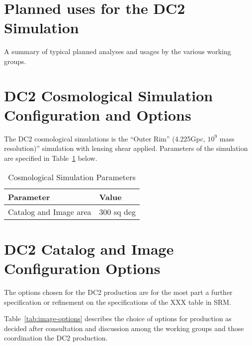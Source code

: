 \documentclass[12pt,letterpaper]{article}
\begin{document}
\section{Planned uses for the DC2 Simulation}

A summary of typical planned analyses and usages by the various
working groups.


\section{DC2 Cosmological Simulation Configuration and Options}

The DC2 cosmological simulations is the “Outer Rim” (4.225Gpc, $10^9$
mass resolution)” simulation with lensing shear applied.  Parameters
of the simulation are specified in Table~\ref{tab:csim-options} below.

\begin{table}[!htb]
  \centering
  \begin{tabular}{| l| l| }
    \hline 
    Parameter                       & Value   \\
    \hline
    Catalog and Image area  & 300 sq deg \\
     \hline
  \end{tabular}
  \caption{Cosmological Simulation Parameters}
  \label{tab:csim-options}
\end{table}


\section{DC2 Catalog and Image Configuration Options}

The options chosen for the DC2 production are for the most part a
further specification or refinement on the specifications of the XXX
table in SRM. 

Table~\ref{tab:image-options} describes the choice of options for
production as decided after consultation and discussion among the
working groups and those coordination the DC2 production.
\end{document}
